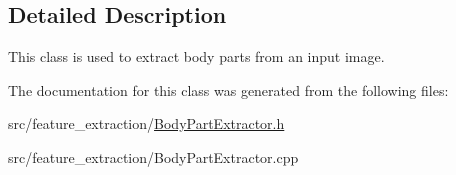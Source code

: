 \subsection{Detailed Description}
This class is used to extract body parts from an input image. 

The documentation for this class was generated from the following files\+:\begin{DoxyCompactItemize}
\item 
src/feature\+\_\+extraction/\mbox{\hyperlink{_body_part_extractor_8h}{Body\+Part\+Extractor.\+h}}\item 
src/feature\+\_\+extraction/Body\+Part\+Extractor.\+cpp\end{DoxyCompactItemize}
